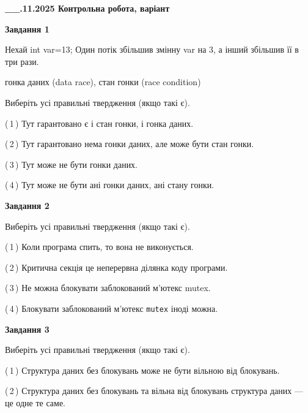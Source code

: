 \documentclass[12pt, ukrainian]{article}
\def\code#1{\Verb!#1!}
\begin{document}

\begin {large}

\textbf{\_\_.11.2025 Контрольна робота, варіант  }\par


{

\begin{center}
\textbf{Завдання 1}
\end{center}
Нехай int var=13; Один потік збільшив змінну var на 3, а інший збільшив її в три рази.

гонка даних (data race), стан гонки (race condition)

Виберіть усі правильні твердження (якщо такі є).\par
\vspace{2mm}
(\,1\,) Тут гарантовано є і стан гонки, і гонка даних.%

(\,2\,) Тут гарантовано нема гонки даних, але може бути стан гонки.%

(\,3\,) Тут може не бути гонки даних.%

(\,4\,) Тут може не бути ані гонки даних, ані стану гонки.%



\begin{center}
\textbf{Завдання 2}
\end{center}
Виберіть усі правильні твердження (якщо такі є).\par
\vspace{2mm}

(\,1\,) Коли програма спить, то вона не виконується.%

(\,2\,) Критична секція це неперервна ділянка коду програми.%

(\,3\,) Не можна блокувати заблокований м’ютекс mutex.%

(\,4\,) Блокувати заблокований м’ютекс  \code{mutex} іноді можна.%



\begin{center}
\textbf{Завдання 3}
\end{center}
Виберіть усі правильні твердження (якщо такі є).\par
\vspace{2mm}

(\,1\,) Структура даних без блокувань може не бути вільною від блокувань.%

(\,2\,) Структура даних без блокувань та вільна від блокувань структура даних --- це одне те саме.%

}
\end{large}
\end{document}
